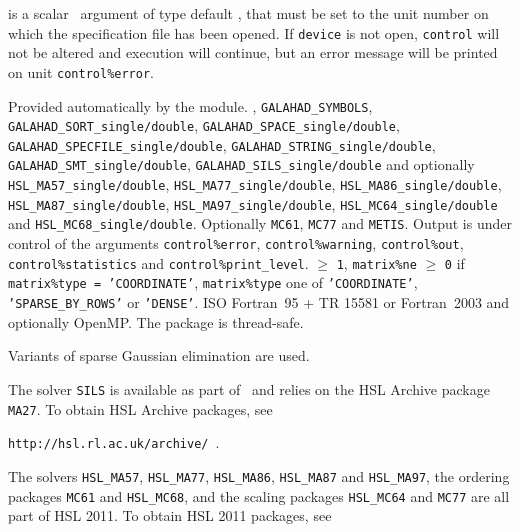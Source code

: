 \documentclass{galahad}
\begin{document}
\begin{description}

 is a scalar \intentin\ argument of type default \integer,
that must be set to the unit number on which the specification file
has been opened. If {\tt device} is not open, {\tt control} will
not be altered and execution will continue, but an error message
will be printed on unit {\tt control\%error}.

\end{description}


\galgeneral

\galworkspace Provided automatically by the module.
,
{\tt GALAHAD\_SYMBOLS},
{\tt GALAHAD\_SORT\_single/double},
{\tt GALAHAD\_SPACE\-\_single/double},
{\tt GALAHAD\_SPECFILE\_single/double},
{\tt GALAHAD\_STRING\_single/double},
{\tt GALAHAD\_SMT\-\_sin\-gle/double},
{\tt GALAHAD\_SILS\_single/double}
and optionally
{\tt HSL\_MA57\_single/double},
{\tt HSL\_MA77\_single/\-double},
{\tt HSL\_MA86\_single/double},
{\tt HSL\_MA87\_single/double},
{\tt HSL\_MA97\_single/double},
{\tt HSL\_MC64\_single\-/double} and
{\tt HSL\_MC68\_single\-/double}.
\galroutines Optionally {\tt MC61}, {\tt MC77} and {\tt METIS}.
\galio Output is under control of the arguments
{\tt control\%error},
{\tt control\%warning},
{\tt control\%out}, \\
{\tt control\-\%statistics}
and {\tt control\%print\_level}.
 $\geq$ {\tt 1},
{\tt matrix\%ne} $\geq$ {\tt 0} if
{\tt matrix\%type = 'COORDINATE'},
{\tt matrix\%type}
one of
{\tt 'COORDINATE'}, {\tt 'SPARSE\_BY\_ROWS'} or   {\tt 'DENSE'}.
\galportability ISO Fortran~95 + TR 15581 or Fortran~2003 and optionally OpenMP.
The package is thread-safe.


\galmethod
Variants of sparse Gaussian elimination are used.

\noindent
The solver {\tt SILS} is available as part of \galahad\ and relies on
the HSL Archive package {\tt MA27}. To obtain HSL Archive packages, see

{\tt http://hsl.rl.ac.uk/archive/ }.

\noindent
The solvers
{\tt HSL\_MA57},
{\tt HSL\_MA77},
{\tt HSL\_MA86},
{\tt HSL\_MA87}
and
{\tt HSL\_MA97}, the ordering packages
{\tt MC61} and {\tt HSL\_MC68}, and the scaling packages
{\tt HSL\_MC64} and {\tt MC77}
are all part of HSL 2011.
To obtain HSL 2011 packages, see
\end{document}
